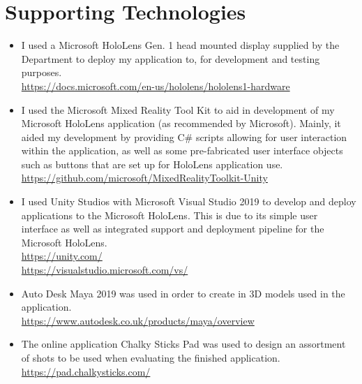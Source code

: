 \documentclass[ %
                author={Finn Alexander Wilkinson},
                supervisor={Dr. Andrew Calway},
                degree={MEng},
                title={\centering A Mixed Reality Aim Assistant for Pool and Snooker},
                subtitle={},
                type={Enterprise},
                year={2021} ]{dissertation}
\begin{document}
\chapter*{Supporting Technologies}
\begin{itemize}
    \item I used a Microsoft HoloLens Gen. 1 head mounted display supplied by the Department to deploy my application to, for development and testing purposes.\\
        \url{https://docs.microsoft.com/en-us/hololens/hololens1-hardware}
    \item I used the Microsoft Mixed Reality Tool Kit to aid in development of my Microsoft HoloLens application (as recommended by Microsoft). Mainly, it aided my development by providing C\# scripts allowing for user interaction within the application, as well as some pre-fabricated user interface objects such as buttons that are set up for HoloLens application use.\\
        \url{https://github.com/microsoft/MixedRealityToolkit-Unity}
    \item I used Unity Studios with Microsoft Visual Studio 2019 to develop and deploy applications to the Microsoft HoloLens. This is due to its simple user interface as well as integrated support and deployment pipeline for the Microsoft HoloLens.\\
        \url{https://unity.com/}\\
        \url{https://visualstudio.microsoft.com/vs/}
    \item Auto Desk Maya 2019 was used in order to create in 3D models used in the application.\\
        \url{https://www.autodesk.co.uk/products/maya/overview}
    \item The online application Chalky Sticks Pad was used to design an assortment of shots to be used when evaluating the finished application.
        \url{https://pad.chalkysticks.com/}
\end{itemize}

\end{document}
